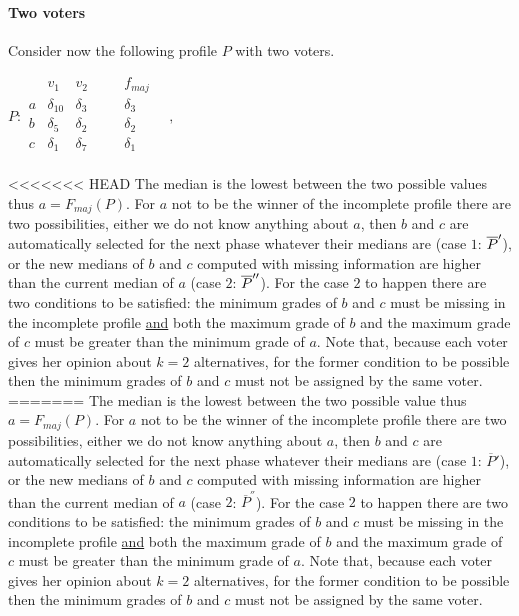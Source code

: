 \documentclass[version=3.21, pagesize, twoside=off, bibliography=totoc, DIV=calc, fontsize=12pt, a4paper]{scrartcl}
\begin{document}
\paragraph{Two voters}
Consider now the following profile $P$ with two voters.
\begin{center}
	$P:
	\begin{array}{ccccc}
		& v_1 & v_2 & \quad & f_{maj} \\
		a &	\delta_{10} & \delta_3 & \quad& \delta_3 \\
		b &	\delta_5 & \delta_2 &\quad& \delta_2 \\
		c &	\delta_1 & \delta_7 &\quad& \delta_1 \\
	\end{array} \quad, \qquad
	$
\end{center}
<<<<<<< HEAD
The median is the lowest between the two possible values thus $a=F_{maj}(P)$. For $a$ not to be the winner of the incomplete profile there are two possibilities, either we do not know anything about $a$, then $b$ and $c$ are automatically selected for the next phase whatever their medians are (case $1$: $\overline{P}'$), or the new medians of $b$ and $c$ computed with missing information are higher than the current median of $a$ (case $2$: $\overline{P}^{\prime\prime}$). For the case $2$ to happen there are two conditions to be satisfied: the minimum grades of $b$ and $c$ must be missing in the incomplete profile \underline{and} both the maximum grade of $b$ and the maximum grade of $c$ must be greater than the minimum grade of $a$. Note that, because each voter gives her opinion about $k=2$ alternatives, for the former condition to be possible then the minimum grades of $b$ and $c$ must not be assigned by the same voter. 
=======
The median is the lowest between the two possible value thus $a=F_{maj}(P)$. For $a$ not to be the winner of the incomplete profile there are two possibilities, either we do not know anything about $a$, then $b$ and $c$ are automatically selected for the next phase whatever their medians are 
(case $1$: $\overline{P}'$), or the new medians of $b$ and $c$  computed with missing information are higher than the current median of $a$ (case $2$: $\overline{P}^{\second}$). For the case $2$ to happen there are two conditions to be satisfied: the minimum grades of $b$ and $c$ must be missing in the incomplete profile \underline{and} both the maximum grade of $b$ and the maximum grade of $c$ must be greater than the minimum grade of $a$. Note that, because each voter gives her opinion about $k=2$ alternatives, for the former condition to be possible then the minimum grades of $b$ and $c$ must not be assigned by the same voter. 
\end{document}
